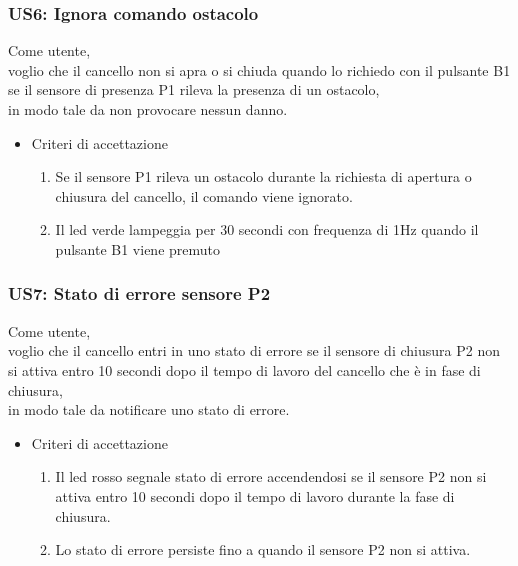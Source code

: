 \documentclass[12pt]{article}
\begin{document}
\subsubsection{US6: Ignora comando ostacolo}
Come utente, \\
voglio che il cancello non si apra o si chiuda quando lo richiedo con il pulsante B1 se il sensore di presenza P1 rileva la presenza di un ostacolo, \\
in modo tale da non provocare nessun danno.
\begin{itemize}
    \item Criteri di accettazione
    \begin{enumerate}
        \item Se il sensore P1 rileva un ostacolo durante la richiesta di apertura o chiusura del cancello, il comando viene ignorato.
        \item Il led verde lampeggia per 30 secondi con frequenza di 1Hz quando il pulsante B1 viene premuto
   \end{enumerate}
\end{itemize}
\subsubsection{US7: Stato di errore sensore P2}
Come utente, \\
voglio che il cancello entri in uno stato di errore se il sensore di chiusura P2 non si attiva entro 10 secondi dopo il tempo di lavoro del cancello che è in fase di chiusura,\\
in modo tale da notificare uno stato di errore.
\begin{itemize}
    \item Criteri di accettazione
    \begin{enumerate}
        \item Il led rosso segnale stato di errore accendendosi se il sensore P2 non si attiva entro 10 secondi dopo il tempo di lavoro durante la fase di chiusura.
        \item Lo stato di errore persiste fino a quando il sensore P2 non si attiva.
    \end{enumerate}
\end{itemize}
\end{document}
